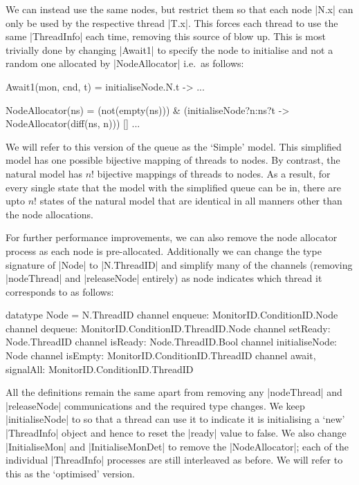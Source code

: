 We can instead use the same nodes, but restrict them so that each node |N.x| can only be used by the respective thread |T.x|. This forces each thread to use the same |ThreadInfo| each time, removing this source of blow up. This is most trivially done by changing |Await1| to specify the node to initialise and not a random one allocated by |NodeAllocator| i.e.~as follows:

\begin{cspm}
  Await1(mon, cnd, t) = initialiseNode.N.t -> ...

  NodeAllocator(ns) = 
      (not(empty(ns))) & (initialiseNode?n:ns?t -> NodeAllocator(diff(ns, {n}))) 
   [] ...
\end{cspm}

We will refer to this version of the queue as the `Simple' model. This simplified model has one possible bijective mapping of threads to nodes. By contrast, the natural model has $n!$ bijective mappings of threads to nodes. As a result, for every single state that the model with the simplified queue can be in, there are upto $n!$ states of the natural model that are identical in all manners other than the node allocations.

For further performance improvements, we can also remove the node allocator process as each node is pre-allocated. Additionally we can change the type signature of |Node| to |N.ThreadID| and simplify many of the channels (removing |nodeThread| and |releaseNode| entirely) as node indicates which thread it corresponds to as follows:

\begin{cspm}
  datatype Node = N.ThreadID
  channel enqueue: MonitorID.ConditionID.Node 
  channel dequeue: MonitorID.ConditionID.ThreadID.Node
  channel setReady: Node.ThreadID
  channel isReady: Node.ThreadID.Bool
  channel initialiseNode: Node
  channel isEmpty: MonitorID.ConditionID.ThreadID
  channel await, signalAll: MonitorID.ConditionID.ThreadID
\end{cspm}

All the definitions remain the same apart from removing any |nodeThread| and |releaseNode| communications and the required type changes. We keep |initialiseNode| to so that a thread can use it to indicate it is initialising a `new' |ThreadInfo| object and hence to reset the |ready| value to false. We also change |InitialiseMon| and |InitialiseMonDet| to remove the |NodeAllocator|; each of the individual |ThreadInfo| processes are still interleaved as before. We will refer to this as the `optimised' version.

